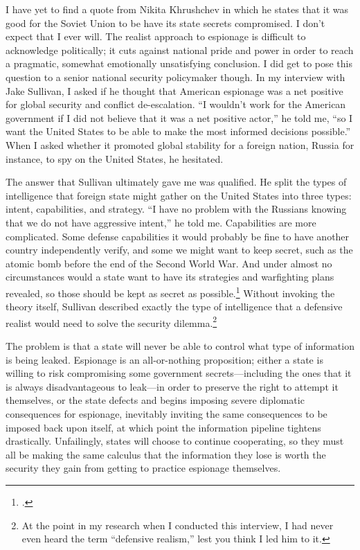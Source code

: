 \documentclass[11pt]{memoir}
\begin{document}
\begin{refsegment}
I have yet to find a quote from Nikita Khrushchev in which he states that it was good for the Soviet Union to be have its state secrets compromised. I don't expect that I ever will. The realist approach to espionage is difficult to acknowledge politically; it cuts against national pride and power in order to reach a pragmatic, somewhat emotionally unsatisfying conclusion. I did get to pose this question to a senior national security policymaker though. In my interview with Jake Sullivan, I asked if he thought that American espionage was a net positive for global security and conflict de-escalation. ``I wouldn't work for the American government if I did not believe that it was a net positive actor,'' he told me, ``so I want the United States to be able to make the most informed decisions possible.'' When I asked whether it promoted global stability for a foreign nation, Russia for instance, to spy on the United States, he hesitated.

The answer that Sullivan ultimately gave me was qualified. He split the types of intelligence that foreign state might gather on the United States into three types: intent, capabilities, and strategy. ``I have no problem with the Russians knowing that we do not have aggressive intent,'' he told me. Capabilities are more complicated. Some defense capabilities it would probably be fine to have another country independently verify, and some we might want to keep secret, such as the atomic bomb before the end of the Second World War. And under almost no circumstances would a state want to have its strategies and warfighting plans revealed, so those should be kept as secret as possible.\footcite{sullivan_personal_2019} Without invoking the theory itself, Sullivan described exactly the type of intelligence that a defensive realist would need to solve the security dilemma.\footnote{At the point in my research when I conducted this interview, I had never even heard the term ``defensive realism,'' lest you think I led him to it.}

The problem is that a state will never be able to control what type of information is being leaked. Espionage is an all-or-nothing proposition; either a state is willing to risk compromising some government secrets---including the ones that it is always disadvantageous to leak---in order to preserve the right to attempt it themselves, or the state defects and begins imposing severe diplomatic consequences for espionage, inevitably inviting the same consequences to be imposed back upon itself, at which point the information pipeline tightens drastically. Unfailingly, states will choose to continue cooperating, so they must all be making the same calculus that the information they lose is worth the security they gain from getting to practice espionage themselves.


\end{refsegment}
\end{document}
